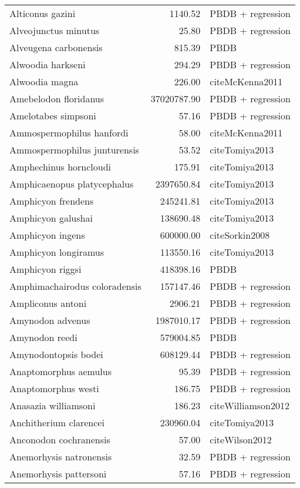 \begin{table}[ht]
\begin{tabular}{lrl}
  Alticonus gazini & 1140.52 & PBDB + regression \\ 
  Alveojunctus minutus & 25.80 & PBDB + regression \\ 
  Alveugena carbonensis & 815.39 & PBDB \\ 
  Alwoodia harkseni & 294.29 & PBDB + regression \\ 
  Alwoodia magna & 226.00 & cite{McKenna2011} \\ 
  Amebelodon floridanus & 37020787.90 & PBDB + regression \\ 
  Amelotabes simpsoni & 57.16 & PBDB + regression \\ 
  Ammospermophilus hanfordi & 58.00 & cite{McKenna2011} \\ 
  Ammospermophilus junturensis & 53.52 & cite{Tomiya2013} \\ 
  Amphechinus horncloudi & 175.91 & cite{Tomiya2013} \\ 
  Amphicaenopus platycephalus & 2397650.84 & cite{Tomiya2013} \\ 
  Amphicyon frendens & 245241.81 & cite{Tomiya2013} \\ 
  Amphicyon galushai & 138690.48 & cite{Tomiya2013} \\ 
  Amphicyon ingens & 600000.00 & cite{Sorkin2008} \\ 
  Amphicyon longiramus & 113550.16 & cite{Tomiya2013} \\ 
  Amphicyon riggsi & 418398.16 & PBDB \\ 
  Amphimachairodus coloradensis & 157147.46 & PBDB + regression \\ 
  Ampliconus antoni & 2906.21 & PBDB + regression \\ 
  Amynodon advenus & 1987010.17 & PBDB + regression \\ 
  Amynodon reedi & 579004.85 & PBDB \\ 
  Amynodontopsis bodei & 608129.44 & PBDB + regression \\ 
  Anaptomorphus aemulus & 95.39 & PBDB + regression \\ 
  Anaptomorphus westi & 186.75 & PBDB + regression \\ 
  Anasazia williamsoni & 186.23 & cite{Williamson2012} \\ 
  Anchitherium clarencei & 230960.04 & cite{Tomiya2013} \\ 
  Anconodon cochranensis & 57.00 & cite{Wilson2012} \\ 
  Anemorhysis natronensis & 32.59 & PBDB + regression \\ 
  Anemorhysis pattersoni & 57.16 & PBDB + regression \\ 

\end{tabular}
\end{table}
